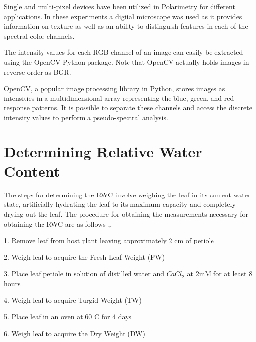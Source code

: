 Single and multi-pixel devices have been utilized in Polarimetry for different applications.  In these experiments a digital microscope was used as it provides information on texture as well as an ability to distinguish features in each of the spectral color channels.

The intensity values for each RGB channel of an image can easily be extracted using the OpenCV Python package.  Note that OpenCV actually holds images in reverse order as BGR.

OpenCV, a popular image processing library in Python, stores images as intensities in a multidimensional array representing the blue, green, and red response patterns.  It is possible to separate these channels and access the discrete intensity values to perform a pseudo-spectral analysis.

\section{Determining Relative Water Content}
The steps for determining the RWC involve weighing the leaf in its current water state, artificially hydrating the leaf to its maximum capacity and completely drying out the leaf.  The procedure for obtaining the measurements necessary for obtaining the RWC are as follows \cite{ecophysiology},\cite{rwc:1},

1.	Remove leaf from host plant leaving approximately 2 cm of petiole

2.	Weigh leaf to acquire the Fresh Leaf Weight (FW)

3.	Place leaf petiole in solution of distilled water and ${CaCl}_2$ at 2mM for at least 8 hours

4.	Weigh leaf to acquire Turgid Weight (TW)

5.	Place leaf in an oven at 60 \textdegree C for 4 days

6.	Weigh leaf to acquire the Dry Weight (DW)


